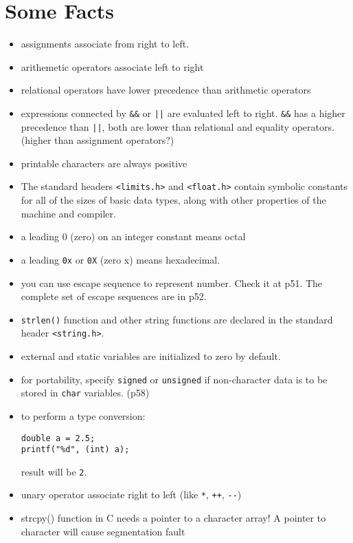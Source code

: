 \documentclass[12pt]{article}
\date{\today}
\title{}
\begin{document}
\tableofcontents

\section{Some Facts}
\label{sec:orgb3767f9}
\begin{itemize}
\item assignments associate from right to left.
\item arithemetic operators associate left to right
\item relational operators have lower precedence than arithmetic operators
\item expressions connected by \texttt{\&\&} or \texttt{||} are evaluated left to right. \texttt{\&\&} has a higher precedence than \texttt{||}, both are lower than relational and equality operators. (higher than assignment operators?)
\item printable characters are always positive
\item The standard headers \texttt{<limits.h>} and \texttt{<float.h>} contain symbolic constants for all of the sizes of basic data types, along with other properties of the machine and compiler.
\item a leading 0 (zero) on an integer constant means octal
\item a leading \texttt{0x} or \texttt{0X} (zero x) means hexadecimal.
\item you can use escape sequence to represent number. Check it at p51. The complete set of escape sequences are in p52.
\item \texttt{strlen()} function and other string functions are declared in the standard header \texttt{<string.h>}.
\item external and static variables are initialized to zero by default.
\item for portability, specify \texttt{signed} or \texttt{unsigned} if non-character data is to be stored in \texttt{char} variables. (p58)
\item to perform a type conversion:
\begin{verbatim}
double a = 2.5;
printf("%d", (int) a);  
\end{verbatim}
result will be \texttt{2}.
\item unary operator associate right to left (like \texttt{*}, \texttt{++}, \texttt{-{}-})
\item strcpy() function in C needs a pointer to a character array! A pointer to character will cause segmentation fault
\end{itemize}
\end{document}
